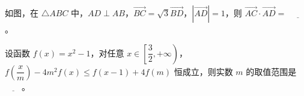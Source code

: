 \begin{question}
如图，在 $\triangle ABC$ 中，$AD\perp AB$，$\overrightarrow{BC}=\sqrt3\overrightarrow{BD}$，$|\overrightarrow{AD}|=1$，则 $\overrightarrow{AC}\cdot\overrightarrow{AD}=$ $\underline{\qquad}$。
\nopagebreak[4]
\begin{center}\end{center}
\nopagebreak[4]
\end{question}
\endgroup
\begin{question}
设函数 $f(x)=x^2-1$，对任意 $x\in\left[\dfrac32,+\infty\right)$，$f\left(\dfrac xm\right)-4m^2f(x)\leqslant f(x-1)+4f(m)$ 恒成立，则实数 $m$ 的取值范围是$\underline{\qquad}$。

\end{question}

